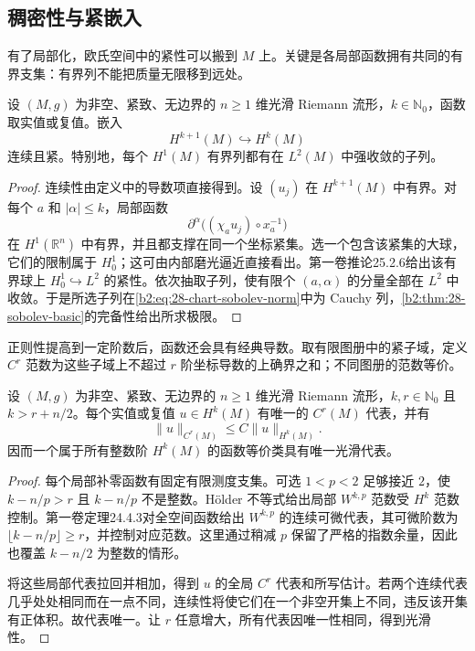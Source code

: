 \subsection{稠密性与紧嵌入}
\label{b2:subsec:260103}

有了局部化，欧氏空间中的紧性可以搬到 \(M\) 上。关键是各局部函数拥有共同的有界支集：有界列不能把质量无限移到远处。

\begin{theorem}\label{b2:thm:28-manifold-rellich}
设 \((M,g)\) 为非空、紧致、无边界的 \(n\geq1\) 维光滑 Riemann 流形，\(k\in\mathbb N_0\)，函数取实值或复值。嵌入
\[
 H^{k+1}(M)\hookrightarrow H^k(M)
\]
连续且紧。特别地，每个 \(H^1(M)\) 有界列都有在 \(L^2(M)\) 中强收敛的子列。
\end{theorem}
\begin{proof}
连续性由定义中的导数项直接得到。设 \((u_j)\) 在 \(H^{k+1}(M)\) 中有界。对每个 \(a\) 和 \(|\alpha|\leq k\)，局部函数
\[
 \partial^\alpha\bigl((\chi_a u_j)\circ x_a^{-1}\bigr)
\]
在 \(H^1(\mathbb R^n)\) 中有界，并且都支撑在同一个坐标紧集。选一个包含该紧集的大球，它们的限制属于 \(H_0^1\)；这可由内部磨光逼近直接看出。第一卷推论25.2.6给出该有界球上 \(H_0^1\hookrightarrow L^2\) 的紧性。依次抽取子列，使有限个 \((a,\alpha)\) 的分量全部在 \(L^2\) 中收敛。于是所选子列在\eqref{b2:eq:28-chart-sobolev-norm}中为 Cauchy 列，\cref{b2:thm:28-sobolev-basic}的完备性给出所求极限。
\end{proof}

正则性提高到一定阶数后，函数还会具有经典导数。取有限图册中的紧子域，定义 \(C^r\) 范数为这些子域上不超过 \(r\) 阶坐标导数的上确界之和；不同图册的范数等价。

\begin{proposition}[连续可微代表]\label{b2:prop:28-sobolev-continuous}
设 \((M,g)\) 为非空、紧致、无边界的 \(n\geq1\) 维光滑 Riemann 流形，\(k,r\in\mathbb N_0\) 且 \(k>r+n/2\)。每个实值或复值 \(u\in H^k(M)\) 有唯一的 \(C^r(M)\) 代表，并有
\[
 \|u\|_{C^r(M)}\leq C\|u\|_{H^k(M)}.
\]
因而一个属于所有整数阶 \(H^k(M)\) 的函数等价类具有唯一光滑代表。
\end{proposition}
\begin{proof}
每个局部补零函数有固定有限测度支集。可选 \(1<p<2\) 足够接近 \(2\)，使 \(k-n/p>r\) 且 \(k-n/p\) 不是整数。Hölder 不等式给出局部 \(W^{k,p}\) 范数受 \(H^k\) 范数控制。第一卷定理24.4.3对全空间函数给出 \(W^{k,p}\) 的连续可微代表，其可微阶数为 \(\lfloor k-n/p\rfloor\geq r\)，并控制对应范数。这里通过稍减 \(p\) 保留了严格的指数余量，因此也覆盖 \(k-n/2\) 为整数的情形。

将这些局部代表拉回并相加，得到 \(u\) 的全局 \(C^r\) 代表和所写估计。若两个连续代表几乎处处相同而在一点不同，连续性将使它们在一个非空开集上不同，违反该开集有正体积。故代表唯一。让 \(r\) 任意增大，所有代表因唯一性相同，得到光滑性。
\end{proof}

